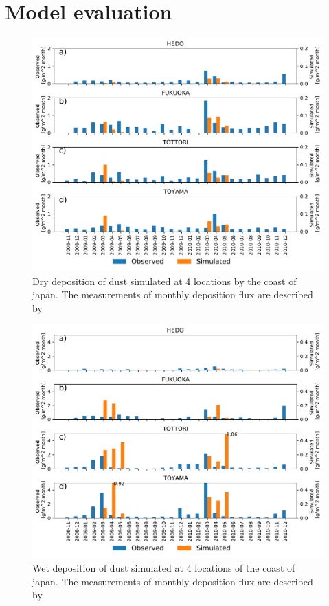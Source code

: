 \section{Model evaluation}
\begin{figure}[hptb]
    \centering
    \includegraphics[width=\textwidth]{texfiles/figs/monthly_accumulated_dry_depostion_japan.pdf}
    \caption{Dry deposition of dust simulated at 4 locations by the coast of japan. The measurements of monthly deposition flux are described by \textcite{osada2014wet}}
    \label{fig:model_eval_dry_deposition}
\end{figure}

\begin{figure}[hptb]
    \centering
    \includegraphics[width=\textwidth]{texfiles/figs/monthly_accumulated_wet_depostion_japan.pdf}
    \caption{Wet deposition of dust simulated at 4 locations of the coast of japan. The measurements of monthly deposition flux are described by \textcite{osada2014wet}}
    \label{fig:model_eval_wet_deposition}
\end{figure}

